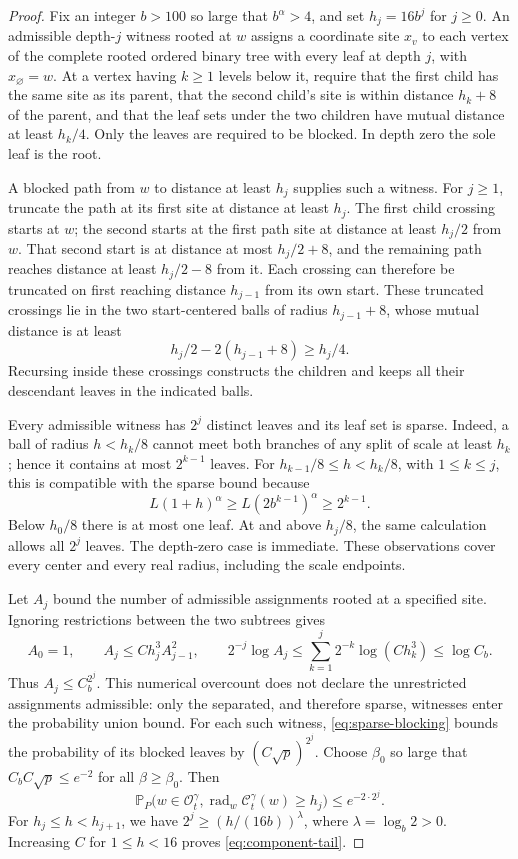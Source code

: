 \begin{proof}
Fix an integer \(b>100\) so large that \(b^\alpha>4\), and set
\(h_j=16b^j\) for \(j\ge0\).  An admissible depth-\(j\) witness
rooted at \(w\) assigns a coordinate site \(x_v\) to each vertex
of the complete rooted ordered binary tree with every leaf at depth
\(j\), with
\(x_\varnothing=w\).  At a vertex having \(k\ge1\) levels
below it, require that the first child has the same site as its
parent, that the second child's site is within distance \(h_k+8\)
of the parent, and that the leaf sets under the two children have
mutual distance at least \(h_k/4\).  Only the leaves are required
to be blocked.  In depth zero the sole leaf is the root.

A blocked path from \(w\) to distance at least \(h_j\) supplies
such a witness.  For \(j\ge1\), truncate the path at its first
site at distance at least \(h_j\).  The first child crossing
starts at \(w\); the second starts at the first path site at
distance at least \(h_j/2\) from \(w\).  That second start is
at distance at most \(h_j/2+8\), and the remaining path reaches
distance at least \(h_j/2-8\) from it.  Each crossing can therefore
be truncated on first reaching distance \(h_{j-1}\) from its
own start.  These truncated crossings lie in the two start-centered
balls of radius \(h_{j-1}+8\), whose mutual distance is at least
\[
 h_j/2-2(h_{j-1}+8)\ge h_j/4.
\]
Recursing inside these crossings constructs the children and keeps
all their descendant leaves in the indicated balls.

Every admissible witness has \(2^j\) distinct leaves and its leaf
set is sparse.  Indeed, a ball of radius \(h<h_k/8\) cannot meet
both branches of any split of scale at least \(h_k\); hence it
contains at most \(2^{k-1}\) leaves.  For
\(h_{k-1}/8\le h<h_k/8\), with \(1\le k\le j\), this is
compatible with the sparse bound because
\[
 L(1+h)^\alpha\ge L(2b^{k-1})^\alpha\ge2^{k-1}.
\]
Below \(h_0/8\) there is at most one leaf.  At and above
\(h_j/8\), the same calculation allows all \(2^j\) leaves.
The depth-zero case is immediate.  These observations cover every
center and every real radius, including the scale endpoints.

Let \(A_j\) bound the number of admissible assignments rooted at
a specified site.  Ignoring restrictions between the two subtrees
gives
\[
 A_0=1,\qquad A_j\le Ch_j^3 A_{j-1}^2,
 \qquad
 2^{-j}\log A_j
 \le\sum_{k=1}^j2^{-k}\log(Ch_k^3)\le\log C_b.
\]
Thus \(A_j\le C_b^{2^j}\).  This numerical overcount does not
declare the unrestricted assignments admissible: only the separated,
and therefore sparse, witnesses enter the probability union bound.
For each such witness, \eqref{eq:sparse-blocking} bounds the
probability of its blocked leaves by \((C\sqrt p)^{2^j}\).
Choose \(\beta_0\) so large that \(C_bC\sqrt p\le e^{-2}\)
for all \(\beta\ge\beta_0\).  Then
\[
 \mathbb P_P\bigl(w\in\mathcal O_t^\gamma,
   \operatorname{rad}_w\mathcal C_t^\gamma(w)\ge h_j\bigr)
 \le e^{-2\cdot2^j}.
\]
For \(h_j\le h<h_{j+1}\), we have
\(2^j\ge(h/(16b))^\lambda\), where
\(\lambda=\log_b2>0\).  Increasing \(C\) for \(1\le h<16\)
proves \eqref{eq:component-tail}.
\end{proof}


